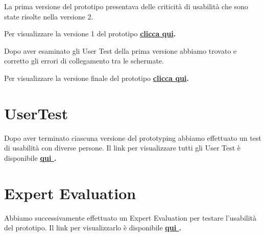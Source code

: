 \documentclass{article}
\begin{document}
    \vspace{1cm}
    \vspace{0.5cm}
    \par La prima versione del prototipo presentava delle criticità di usabilità che sono state risolte nella versione 2.
    \par Per visualizzare la versione 1 del prototipo \textbf{\href{https://t.ly/g4ZQ}{clicca qui}.}

    \vspace{1cm}
    \vspace{0.5cm}
    \par Dopo aver esaminato gli User Test della prima versione abbiamo trovato e corretto gli errori di collegamento tra le schermate. 
    \par Per visualizzare la versione finale del prototipo \textbf{\href{https://t.ly/ecm4}{clicca qui}.}
    
\section{UserTest} \par\vspace{0.5cm}

\par Dopo aver terminato ciascuna versione del prototyping abbiamo effettuato un test di usabilità con diverse persone.
Il link per visualizzare tutti gli User Test è disponibile \textbf{\href{https://www.notion.so/User-Testing-03a9697158cb4f93b3439fe694f33ac9}{qui }.}
\section{Expert Evaluation}
\par Abbiamo successivamente effettuato un Expert Evaluation per testare l'usabilità del prototipo.
Il link per visualizzarlo è disponibile \textbf{\href{https://www.notion.so/Expert-Evaluation-7bc49cae89414742a51b71f6faebecdd}{qui }.}

\vspace{1cm}
\end{document}
